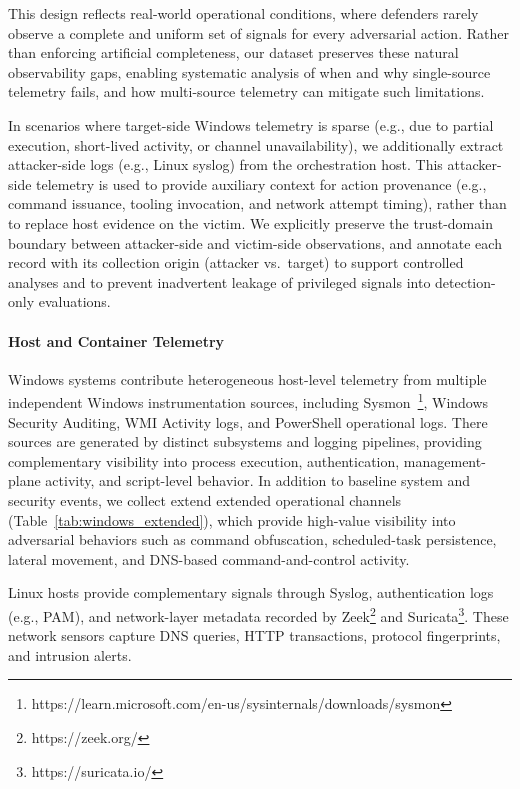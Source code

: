 This design reflects real-world operational conditions, where defenders rarely observe a complete and uniform set of signals for every adversarial action. Rather than enforcing artificial completeness, our dataset preserves these natural observability gaps, enabling systematic analysis of when and why single-source telemetry fails, and how multi-source telemetry can mitigate such limitations. 

In scenarios where target-side Windows telemetry is sparse (e.g., due to partial execution, short-lived activity, or channel unavailability), we additionally extract attacker-side logs (e.g., Linux syslog) from the orchestration host. This attacker-side telemetry is used to provide auxiliary context for action provenance (e.g., command issuance, tooling invocation, and network attempt timing), rather than to replace host evidence on the victim. We explicitly preserve the trust-domain boundary between attacker-side and victim-side observations, and annotate each record with its collection origin (attacker vs.\ target) to support controlled analyses and to prevent inadvertent leakage of privileged signals into detection-only evaluations.

\paragraph{Host and Container Telemetry}

Windows systems contribute heterogeneous host-level telemetry from multiple independent Windows instrumentation sources, including Sysmon~\footnote{https://learn.microsoft.com/en-us/sysinternals/downloads/sysmon}, Windows Security Auditing, WMI Activity logs, and PowerShell operational logs. There sources are generated by distinct subsystems and logging pipelines, providing complementary visibility into process execution, authentication, management-plane activity, and script-level behavior. In addition to baseline system and security events, we collect extend extended operational channels (Table~\ref{tab:windows_extended}), which provide high-value visibility into adversarial behaviors such as command obfuscation, scheduled-task persistence, lateral movement, and DNS-based command-and-control activity.

Linux hosts provide complementary signals through Syslog, authentication logs (e.g., PAM), and network-layer metadata recorded by Zeek\footnote{https://zeek.org/} and Suricata\footnote{https://suricata.io/}. These network sensors capture DNS queries, HTTP transactions, protocol fingerprints, and intrusion alerts.

